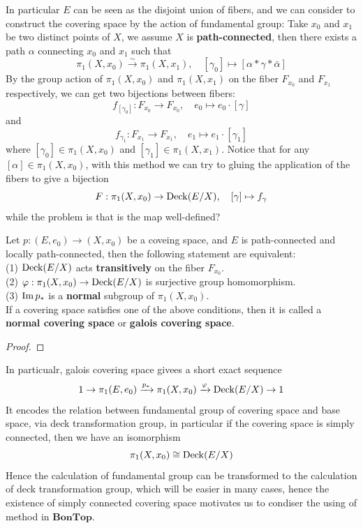 In particular \(E\) can be seen as the disjoint union of fibers, and we can consider to construct the covering space by the action of fundamental group: Take \(x_0\) and \(x_1\) be two distinct points of \(X\), we assume \(X\) is \textbf{path-connected}, then there exists a path \(\alpha\) connecting \(x_0\) and \(x_1\) such that 
\[\pi_1(X,x_0) \xrightarrow{\sim} \pi_1(X,x_1), \quad [\gamma_0] \mapsto [\alpha * \gamma * \bar{\alpha}]\]
By the group action of \(\pi_1(X,x_0)\) and \(\pi_1(X,x_1)\) on the fiber \(F_{x_0}\) and \(F_{x_1}\) respectively, we can get two bijections between fibers:
\[f_{[\gamma_0]}: F_{x_0} \to F_{x_0}, \quad e_0 \mapsto e_0 \cdot [\gamma]\]
and
\[f_{\gamma_1}: F_{x_1} \to F_{x_1}, \quad e_1 \mapsto e_1 \cdot [\gamma_1]\]
where \([\gamma_0] \in \pi_1(X,x_0)\) and \([\gamma_1] \in \pi_1(X,x_1)\). Notice that for any \([\alpha] \in \pi_1(X,x_0)\), with this method we can try to gluing the application of the fibers to give a bijection
\[F: \pi_1(X,x_0) \to \operatorname{Deck}(E/X), \quad [\gamma] \mapsto f_{\gamma}\]
while the problem is that is the map well-defined?


\begin{lemma}
    Let \(p:(E,e_0) \to (X,x_0)\) be a coveing space, and \(E\) is path-connected and locally path-connected, then the following statement are equivalent:\\

    (1) \(\operatorname{Deck}(E/X)\) acts \textbf{transitively} on the fiber \(F_{x_0}\).\\

    (2) \(\varphi: \pi_1(X,x_0) \to \operatorname{Deck}(E/X)\) is surjective group homomorphism.\\

    (3) \(\operatorname{Im} p_*\) is a \textbf{normal} subgroup of \(\pi_1(X,x_0)\).\\

    If a covering space satisfies one of the above conditions, then it is called a \textbf{normal covering space} or \textbf{galois covering space}.
\end{lemma}
\begin{proof}
    
\end{proof}

\begin{remark}
    In particualr, galois covering space givees a short exact sequence
    \[1 \to \pi_1(E,e_0) \xrightarrow{p_*} \pi_1(X,x_0) \xrightarrow{\varphi} \operatorname{Deck}(E/X) \to 1\]
    It encodes the relation between fundamental group of covering space and base space, via deck transformation group, in particular if the covering space is simply connected, then we have an isomorphism
    \[\pi_1(X,x_0) \cong \operatorname{Deck}(E/X)\]
    Hence the calculation of fundamental group can be transformed to the calculation of deck transformation group, which will be easier in many cases, hence the existence of simply connected covering space motivates us to condiser the using of method in \(\mathbf{BonTop}\).


\end{remark}

